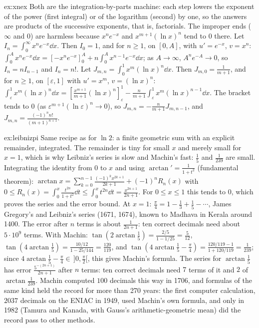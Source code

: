 \begin{solution}{ex:xnex}
\idea Both are the integration-by-parts machine: each step lowers the exponent of the power (first integral) or of the logarithm (second) by one, so the answers are products of the successive exponents, that is, factorials. The improper ends ($\infty$ and $0$) are harmless because $x^ne^{-x}$ and $x^{m+1}(\ln x)^n$ tend to $0$ there.
\writeup Let $I_n=\int_0^\infty x^ne^{-x}\dd x$. Then $I_0=1$, and for $n\ge1$, on $[0,A]$, with $u'=e^{-x}$, $v=x^n$: $\int_0^Ax^ne^{-x}\dd x=\left[-x^ne^{-x}\right]_0^A+n\int_0^Ax^{n-1}e^{-x}\dd x$; as $A\to\infty$, $A^ne^{-A}\to0$, so $I_n=nI_{n-1}$ and $I_n=n!$.
Let $J_{m,n}=\int_0^1x^m(\ln x)^n\dd x$. Then $J_{m,0}=\frac1{m+1}$, and for $n\ge1$, on $[\varepsilon,1]$ with $u'=x^m$, $v=(\ln x)^n$: $\int_\varepsilon^1x^m(\ln x)^n\dd x=\left[\frac{x^{m+1}}{m+1}(\ln x)^n\right]_\varepsilon^1-\frac n{m+1}\int_\varepsilon^1x^m(\ln x)^{n-1}\dd x$. The bracket tends to $0$ (as $\varepsilon^{m+1}(\ln\varepsilon)^n\to0$), so $J_{m,n}=-\frac n{m+1}J_{m,n-1}$, and $J_{m,n}=\frac{(-1)^nn!}{(m+1)^{n+1}}$.
\end{solution}

\begin{solution}{ex:leibnizpi}
\idea Same recipe as for $\ln2$: a finite geometric sum with an explicit remainder, integrated. The remainder is tiny for small $x$ and merely small for $x=1$, which is why Leibniz's series is slow and Machin's fast: $\frac15$ and $\frac1{239}$ are small.
\writeup Integrating the identity from $0$ to $x$ and using $\arctan'=\frac1{1+t^2}$ (fundamental theorem): $\arctan x=\sum_{k=0}^{n-1}\frac{(-1)^kx^{2k+1}}{2k+1}+(-1)^nR_n(x)$ with $0\le R_n(x)=\int_0^x\frac{t^{2n}}{1+t^2}\dd t\le\int_0^xt^{2n}\dd t=\frac{x^{2n+1}}{2n+1}$. For $0\le x\le1$ this tends to $0$, which proves the series and the error bound. At $x=1$: $\frac\pi4=1-\frac13+\frac15-\cdots$, James Gregory's and Leibniz's series (1671, 1674), known to Madhava in Kerala around 1400.
The error after $n$ terms is about $\frac1{2n+1}$: ten correct decimals need about $5\cdot10^9$ terms. With Machin: $\tan\left(2\arctan\frac15\right)=\frac{2/5}{1-1/25}=\frac5{12}$, $\tan\left(4\arctan\frac15\right)=\frac{10/12}{1-25/144}=\frac{120}{119}$, and $\tan\left(4\arctan\frac15-\frac\pi4\right)=\frac{120/119-1}{1+120/119}=\frac1{239}$; since $4\arctan\frac15-\frac\pi4\in\,]0,\frac\pi2[$, this gives Machin's formula. The series for $\arctan\frac15$ has error $\frac{5^{-(2n+1)}}{2n+1}$ after $n$ terms: ten correct decimals need $7$ terms of it and $2$ of $\arctan\frac1{239}$. Machin computed $100$ decimals this way in 1706, and formulas of the same kind held the record for more than 270 years: the first computer calculation, $2037$ decimals on the ENIAC in 1949, used Machin's own formula, and only in 1982 (Tamura and Kanada, with Gauss's arithmetic-geometric mean) did the record pass to other methods.
\end{solution}

